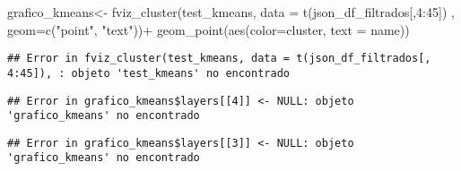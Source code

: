 \documentclass[
]{book}
\newenvironment{Shaded}{\begin{snugshade}}{\end{snugshade}}
\newcommand{\AttributeTok}[1]{\textcolor[rgb]{0.77,0.63,0.00}{#1}}
\newcommand{\ConstantTok}[1]{\textcolor[rgb]{0.00,0.00,0.00}{#1}}
\newcommand{\DecValTok}[1]{\textcolor[rgb]{0.00,0.00,0.81}{#1}}
\newcommand{\FunctionTok}[1]{\textcolor[rgb]{0.00,0.00,0.00}{#1}}
\newcommand{\NormalTok}[1]{#1}
\newcommand{\OtherTok}[1]{\textcolor[rgb]{0.56,0.35,0.01}{#1}}
\newcommand{\SpecialCharTok}[1]{\textcolor[rgb]{0.00,0.00,0.00}{#1}}
\newcommand{\StringTok}[1]{\textcolor[rgb]{0.31,0.60,0.02}{#1}}
\begin{document}
\begin{Shaded}
\begin{Highlighting}[]
\NormalTok{grafico\_kmeans}\OtherTok{\textless{}{-}} \FunctionTok{fviz\_cluster}\NormalTok{(test\_kmeans, }\AttributeTok{data =} \FunctionTok{t}\NormalTok{(json\_df\_filtrados[,}\DecValTok{4}\SpecialCharTok{:}\DecValTok{45}\NormalTok{]) , }\AttributeTok{geom=}\FunctionTok{c}\NormalTok{(}\StringTok{"point"}\NormalTok{, }\StringTok{"text"}\NormalTok{))}\SpecialCharTok{+} \FunctionTok{geom\_point}\NormalTok{(}\FunctionTok{aes}\NormalTok{(}\AttributeTok{color=}\NormalTok{cluster, }\AttributeTok{text =}\NormalTok{ name))}
\end{Highlighting}
\end{Shaded}

\begin{verbatim}
## Error in fviz_cluster(test_kmeans, data = t(json_df_filtrados[, 4:45]), : objeto 'test_kmeans' no encontrado
\end{verbatim}

\begin{Shaded}
\end{Shaded}

\begin{verbatim}
## Error in grafico_kmeans$layers[[4]] <- NULL: objeto 'grafico_kmeans' no encontrado
\end{verbatim}

\begin{Shaded}
\end{Shaded}

\begin{verbatim}
## Error in grafico_kmeans$layers[[3]] <- NULL: objeto 'grafico_kmeans' no encontrado
\end{verbatim}

\begin{Shaded}
\end{Shaded}
\end{document}
